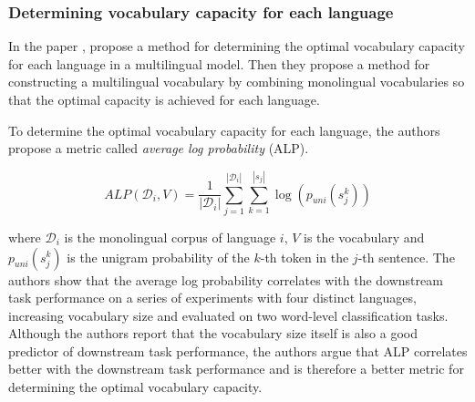 




\subsubsection{Determining vocabulary capacity for each language}

In the paper , \citeauthor{zheng_allocating_2021} propose a method for determining the optimal vocabulary capacity for each language in a multilingual model. Then they propose a method for constructing a multilingual vocabulary by combining monolingual vocabularies so that the optimal capacity is achieved for each language. 



To determine the optimal vocabulary capacity for each language, the authors propose a metric called \textit{average log probability} (ALP). 

$$
ALP(\mathcal{D}_i, V) = \frac{1}{|\mathcal{D}_i|} \sum_{j=1}^{|\mathcal{D}_i|} \sum_{k=1}^{|s_j|} \log(p_{uni}(s^k_{j}))
$$

where $\mathcal{D}_i$ is the monolingual corpus of language $i$, $V$ is the vocabulary and $p_{uni}(s^k_{j})$ is the unigram probability of the $k$-th token in the $j$-th sentence. The authors show that the average log probability correlates with the downstream task performance on a series of experiments with four distinct languages, increasing vocabulary size and evaluated on two word-level classification tasks. Although the authors report that the vocabulary size itself is also a good predictor of downstream task performance, the authors argue that ALP correlates better with the downstream task performance and is therefore a better metric for determining the optimal vocabulary capacity.

